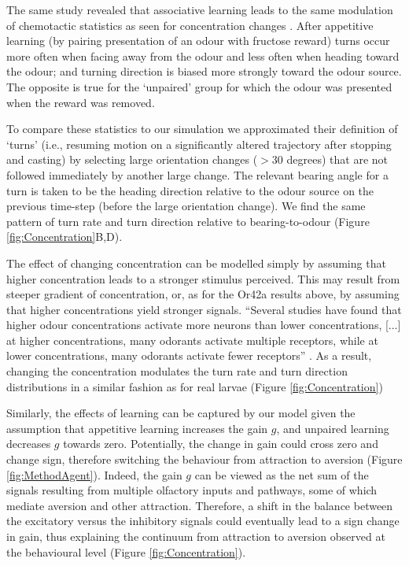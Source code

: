 \documentclass[11pt,a4paper]{article}
\begin{document}
The same study \citep{schleyer2015learning} revealed that associative learning leads to the same modulation of chemotactic statistics as seen for concentration changes \citep[][Figures 3 and 4]{schleyer2015learning}. After appetitive learning (by pairing presentation of an odour with fructose reward) turns occur more often when facing away from the odour and less often when heading toward the odour; and turning direction is biased more strongly toward the odour source. The opposite is true for the ‘unpaired’ group for which the odour was presented when the reward was removed. 


 To compare these statistics to our simulation we approximated their definition of ‘turns’ (i.e., resuming motion on a significantly altered trajectory after stopping and casting) by selecting large orientation changes ($>30$ degrees) that are not followed immediately by another large change. The relevant bearing angle for a turn is taken to be the heading direction relative to the odour source on the previous time-step (before the large orientation change). We find the same pattern of turn rate and turn direction relative to bearing-to-odour (Figure \ref{fig:Concentration}B,D).

The effect of changing concentration can be modelled simply by assuming that higher concentration leads to a stronger stimulus perceived. This may result from steeper gradient of concentration, or, as for the Or42a results above, by assuming that higher concentrations yield stronger signals.  “Several studies have found that higher odour concentrations activate more neurons than lower concentrations, [...] at higher concentrations, many odorants activate multiple receptors, while at lower concentrations, many odorants activate fewer receptors” \citep{hallem2006coding}.
 As a result, changing the concentration modulates the turn rate and turn direction distributions in a similar fashion as for real larvae (Figure \ref{fig:Concentration})

Similarly, the effects of learning can be captured by our model given the assumption that appetitive learning increases the gain $g$, 
and unpaired learning decreases $g$ towards zero. Potentially, the change in gain could cross zero and change sign, therefore switching the behaviour from attraction to aversion (Figure \ref{fig:MethodAgent}). 
Indeed, the gain $g$ can be viewed as the net sum of the signals resulting from multiple olfactory inputs and pathways, some of which mediate aversion and other attraction. Therefore, a shift in the balance between the excitatory versus the inhibitory signals could eventually lead to a sign change in gain, thus explaining the continuum from attraction to aversion observed at the behavioural level (Figure \ref{fig:Concentration}). 
\end{document}
